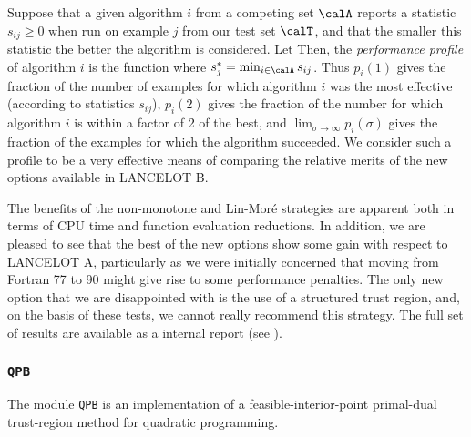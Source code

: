 \documentclass[twoside]{article}
\newcommand{\lana}{{\sf LANCELOT A}}
\newcommand{\lanb}{{\sf LANCELOT B}}
\newcommand{\ltsubsubsection}[1]{\subsubsection{{\tt #1}} \label{#1}}
\begin{document}
Suppose that a given algorithm $i$ from a competing set $\calA$
reports a statistic $s_{ij} \geq 0$
when run on example $j$ from our test set $\calT$,
and that the smaller this statistic the better the algorithm is considered.
Let
Then, the {\em performance profile} of algorithm $i$ is the function
where $s^*_j = \min_{i \in \calA} s_{ij}$.
Thus $p_i(1)$ gives the fraction of the number of examples for which
algorithm $i$ was the most effective (according to statistics $s_{ij}$),
$p_i(2)$ gives
the fraction of the number for which algorithm $i$
is within a factor of 2 of the best, and $\lim_{\sigma\longrightarrow\infty}
p_i(\sigma)$ gives the fraction of the examples for which the algorithm
succeeded. We consider such a profile to be a very effective means
of comparing the relative merits of the new options available in \lanb.

The benefits of the non-monotone and Lin-Mor\'{e} strategies are
apparent both in terms of CPU time and function evaluation reductions.
In addition, we are pleased to see that
the best of the new options show some gain with respect to
\lana, particularly as we were initially concerned that moving from
Fortran 77 to 90 might give rise to some performance penalties.
The only new option that we are disappointed with is the use of a
structured trust region, and, on the basis of these tests,
we cannot really recommend this strategy. The full set of results
are available as a internal report (see ).

\ltsubsubsection{QPB}

The module {\tt QPB} is an implementation of a feasible-interior-point
primal-dual trust-region method for quadratic programming.
\end{document}
